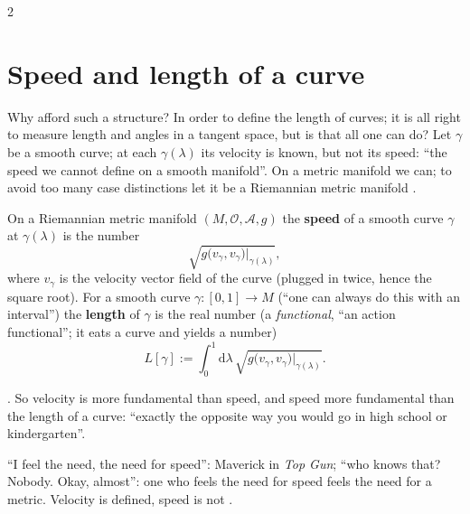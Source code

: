 \begin{paracol}{2}
\section{Speed and length of a curve}\label{sec:c10-length}

Why afford such a structure? In order to define the length of curves; it is all right to measure length and angles in a tangent space, but is that all one can do? Let $\gamma$ be a smooth curve; at each $\gamma(\lambda)$ its velocity is known, but not its speed: ``the speed we cannot define on a smooth manifold''. On a metric manifold we can; to avoid too many case distinctions let it be a Riemannian metric manifold .

\begin{definition}\label{def:c10-speed}
On a Riemannian metric manifold $(M,\mathcal O,\mathcal A,g)$ the \textbf{speed} of a smooth curve $\gamma$ at $\gamma(\lambda)$ is the number
\[
  \sqrt{g\bigl(v_\gamma,v_\gamma\bigr)\big|_{\gamma(\lambda)}},
\]
where $v_\gamma$ is the velocity vector field of the curve (plugged in twice, hence the square root). For a smooth curve $\gamma\colon[0,1]\to M$ (``one can always do this with an interval'') the \textbf{length} of $\gamma$ is the real number (a \emph{functional}, ``an action functional''; it eats a curve and yields a number)
\[
  L[\gamma]:=\int_0^1\mathrm d\lambda\,\sqrt{g\bigl(v_\gamma,v_\gamma\bigr)\big|_{\gamma(\lambda)}}.
\]
\end{definition}
.
So velocity is more fundamental than speed, and speed more fundamental than the length of a curve: ``exactly the opposite way you would go in high school or kindergarten''.
\begin{aside}
``I feel the need, the need for speed'': Maverick in \emph{Top Gun}; ``who knows that? Nobody. Okay, almost'': one who feels the need for speed feels the need for a metric. Velocity is defined, speed is not .
\end{aside}


\end{paracol}

